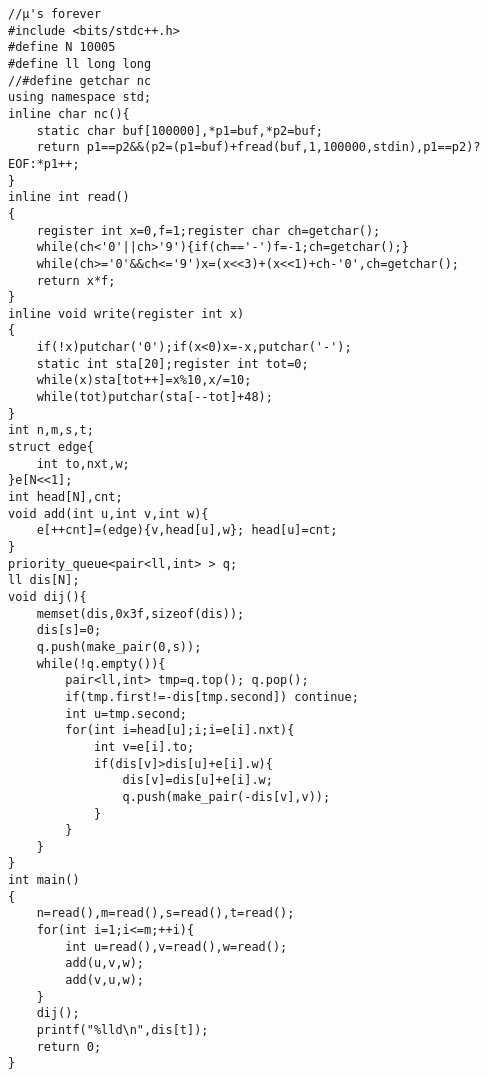 \begin{verbatim}
//μ's forever
#include <bits/stdc++.h>
#define N 10005
#define ll long long 
//#define getchar nc
using namespace std;
inline char nc(){
    static char buf[100000],*p1=buf,*p2=buf;
    return p1==p2&&(p2=(p1=buf)+fread(buf,1,100000,stdin),p1==p2)?EOF:*p1++;
}
inline int read()
{
    register int x=0,f=1;register char ch=getchar();
    while(ch<'0'||ch>'9'){if(ch=='-')f=-1;ch=getchar();}
    while(ch>='0'&&ch<='9')x=(x<<3)+(x<<1)+ch-'0',ch=getchar();
    return x*f;
}
inline void write(register int x)
{
    if(!x)putchar('0');if(x<0)x=-x,putchar('-');
    static int sta[20];register int tot=0;
    while(x)sta[tot++]=x%10,x/=10;
    while(tot)putchar(sta[--tot]+48);
}
int n,m,s,t;
struct edge{
    int to,nxt,w;
}e[N<<1];
int head[N],cnt;
void add(int u,int v,int w){
    e[++cnt]=(edge){v,head[u],w}; head[u]=cnt;
}
priority_queue<pair<ll,int> > q;
ll dis[N];
void dij(){
    memset(dis,0x3f,sizeof(dis));
    dis[s]=0;
    q.push(make_pair(0,s));
    while(!q.empty()){
        pair<ll,int> tmp=q.top(); q.pop();
        if(tmp.first!=-dis[tmp.second]) continue;
        int u=tmp.second;
        for(int i=head[u];i;i=e[i].nxt){
            int v=e[i].to;
            if(dis[v]>dis[u]+e[i].w){
                dis[v]=dis[u]+e[i].w;
                q.push(make_pair(-dis[v],v));
            }
        }
    }
}
int main()
{
    n=read(),m=read(),s=read(),t=read();
    for(int i=1;i<=m;++i){
        int u=read(),v=read(),w=read();
        add(u,v,w);
        add(v,u,w);
    }
    dij();
    printf("%lld\n",dis[t]);
    return 0;
}
\end{verbatim}
